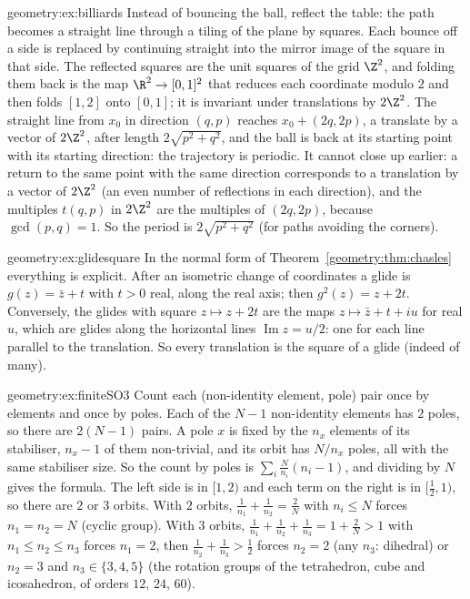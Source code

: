 \begin{solution}{geometry:ex:billiards}
\idea Instead of bouncing the ball, reflect the table: the path becomes a straight line through a tiling of the plane by squares.
\writeup Each bounce off a side is replaced by continuing straight into the mirror image of the square in that side. The reflected squares are
the unit squares of the grid $\Z^2$, and folding them back is the map $\R^2\to[0,1]^2$ that reduces each coordinate modulo $2$ and then
folds $[1,2]$ onto $[0,1]$; it is invariant under translations by $2\Z^2$. The straight line from $x_0$ in direction $(q,p)$ reaches
$x_0+(2q,2p)$, a translate by a vector of $2\Z^2$, after length $2\sqrt{p^2+q^2}$, and the ball is back at its starting point with its
starting direction: the trajectory is periodic. It cannot close up earlier: a return to the same point with the same direction
corresponds to a translation by a vector of $2\Z^2$ (an even number of reflections in each direction), and the multiples $t(q,p)$ in
$2\Z^2$ are the multiples of $(2q,2p)$, because $\gcd(p,q)=1$. So the period is $2\sqrt{p^2+q^2}$ (for paths avoiding the corners).
\end{solution}

\begin{solution}{geometry:ex:glidesquare}
\idea In the normal form of Theorem~\ref{geometry:thm:chasles} everything is explicit.
\writeup After an isometric change of coordinates a glide is $g(z)=\bar z+t$ with $t>0$ real, along the real axis; then
$g^2(z)=z+2t$. Conversely, the glides with square $z\mapsto z+2t$ are the maps $z\mapsto\bar z+t+iu$ for real $u$, which are glides along the
horizontal lines $\operatorname{Im}z=u/2$: one for each line parallel to the translation. So every translation is the square of a glide
(indeed of many).
\end{solution}

\begin{solution}{geometry:ex:finiteSO3}
\idea Count each (non-identity element, pole) pair once by elements and once by poles.
\writeup Each of the $N-1$ non-identity elements has $2$ poles, so there are $2(N-1)$ pairs. A pole $x$ is fixed by the $n_x$ elements of its
stabiliser, $n_x-1$ of them non-trivial, and its orbit has $N/n_x$ poles, all with the same stabiliser size. So the count by poles is
$\sum_i\frac N{n_i}(n_i-1)$, and dividing by $N$ gives the formula. The left side is in $[1,2)$ and each term on the right is in $[\frac12,1)$,
so there are $2$ or $3$ orbits. With $2$ orbits, $\frac1{n_1}+\frac1{n_2}=\frac2N$ with $n_i\le N$ forces $n_1=n_2=N$ (cyclic group). With $3$
orbits, $\frac1{n_1}+\frac1{n_2}+\frac1{n_3}=1+\frac2N>1$ with $n_1\le n_2\le n_3$ forces $n_1=2$, then $\frac1{n_2}+\frac1{n_3}>\frac12$ forces
$n_2=2$ (any $n_3$: dihedral) or $n_2=3$ and $n_3\in\{3,4,5\}$ (the rotation groups of the tetrahedron, cube and icosahedron, of orders
$12$, $24$, $60$).
\end{solution}

